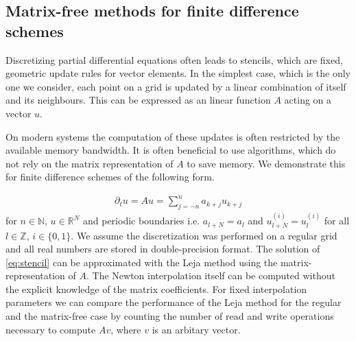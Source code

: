 \documentclass{scrartcl}
\begin{document}


\subsection{Matrix-free methods for finite difference schemes} \label{sec:FDS}
Discretizing partial differential equations often leads to stencils, which are fixed, geometric update rules for vector elements. In the simplest case, which is the only one we consider, each point on a grid is updated by a linear combination of itself and its neighbours. This can be expressed as an linear function $A$ acting on a vector $u$. 

On modern systems the computation of these updates is often restricted by the available memory bandwidth. It is often beneficial to use algorithms, which do not rely on the matrix representation of $A$ to save memory. We demonstrate this for finite difference schemes of the following form.

\begin{align}
\partial_{t}u = Au = \sum_{j=-n}^{n} a_{k+j}u_{k+j} \label{eq:stencil}
\end{align}
for $n\in\mathbb{N}$, $u\in\mathbb{R}^N$ and periodic boundaries i.e. $a_{l+N} = a_{l}$ and $u^{(i)}_{l+N}=u^{(i)}_{l}$ for all $l\in\mathbb{Z}$, $i\in\{0,1\}$.
We assume the discretization was performed on a regular grid and all real numbers are stored in double-precision format.
The solution of \eqref{eq:stencil} can be approximated with the Leja method using the matrix-representation of $A$. The Newton interpolation itself can be computed without the explicit knowledge of the matrix coefficients. For fixed interpolation parameters we can compare the performance of the Leja method for the regular and the matrix-free case by counting the number of read and write operations necessary to compute $Av$, where $v$ is an arbitary vector.
\end{document}
